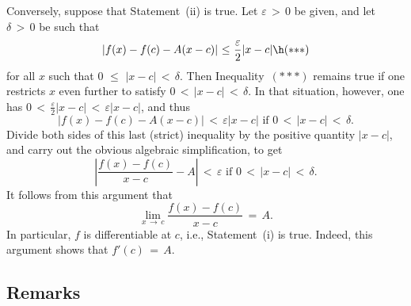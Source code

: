         Conversely, suppose that Statement~(ii) is true. Let ${\varepsilon}\,>\,0$ be given, and let ${\delta}\,>\,0$ be such that
        \begin{displaymath}
        |f(x)-f(c)-A(x-c)|\,\,{\leq}\,\,\frac{{\varepsilon}}{2}|x-c| \h ({\ast}{\ast}{\ast})
        \end{displaymath}
    for all $x$ such that $0\,\,{\leq}\,\,|x-c|\,<\,{\delta}$.
    Then Inequality~$({\ast}{\ast}{\ast})$ remains true if one restricts $x$ even further to satisfy $0\,<\,|x-c|\,<\,{\delta}$.
    In that situation,  however, one has $0\,<\,{\displaystyle \frac{{\varepsilon}}{2}}|x-c|\,<\,{\varepsilon}|x-c|$, and thus
        \begin{displaymath}
        |f(x)-f(c) - A(x-c)|\,<\,{\varepsilon}|x-c| \mbox{ if $0\,<\,|x-c|\,<\,{\delta}$}.
        \end{displaymath}
    Divide both sides of this last (strict) inequality by the positive quantity $|x-c|$, and carry out the obvious algebraic simplification, to get
        \begin{displaymath}
        \left|\frac{f(x)-f(c)}{x-c} - A\right|\,<\,{\varepsilon} \mbox{ if $0\,<\,|x-c|\,<\,{\delta}$}.
        \end{displaymath}
    It follows from this argument that
        \begin{displaymath}
        \lim_{x \,{\rightarrow}\, c} \frac{f(x)-f(c)}{x-c} \,=\, A.
        \end{displaymath}
    In particular, $f$ is differentiable at $c$, i.e., Statement~(i) is true. Indeed, this argument shows that $f'(c) \,=\, A$. \Q

\V
\V


             \subsection{\small{\bf Remarks}}
            \label{RemrkE55.30}

\V

